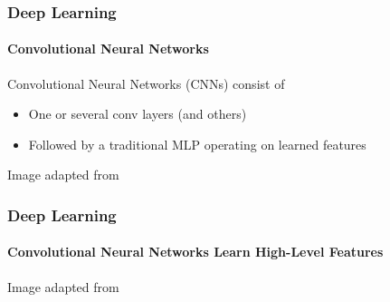 \documentclass[xetex,professionalfont]{beamer}
\renewcommand\emph[1]{\textcolor{tuwcvl_inf_red}{#1}}
\begin{document}

\begin{frame}
\frametitle{Deep Learning}
\framesubtitle{Convolutional Neural Networks}

\emph{Convolutional Neural Networks} (\emph{CNNs}) consist of
\begin{itemize}
    \item One or several conv layers (and others)
    \item Followed by a traditional MLP operating on learned features
\end{itemize}

\medskip
\begin{center}
    {\centering Image adapted from \cite{sermanet2012}} %
\end{center}

\end{frame}


\begin{frame}
\frametitle{Deep Learning}
\framesubtitle{Convolutional Neural Networks Learn High-Level Features}

\begin{center}
    {\centering Image adapted from \cite{zeiler2014}}
\end{center}

\end{frame}
\end{document}
